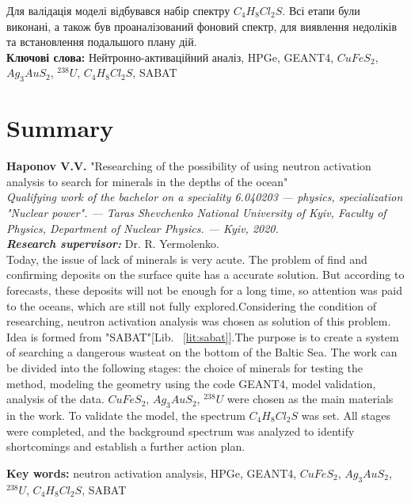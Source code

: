 \documentclass[a4paper, 14pt]{article}
\numberwithin{equation}{section}
\numberwithin{table}{section}
\begin{document}
Для валідація моделі відбувався набір спектру $C_4H_8Cl_2S$.
Всі етапи були виконані, а також був проаналізований фоновий спектр, для виявлення недоліків та встановлення подальшого плану дій. \\
{\bf Ключові слова:} Нейтронно-активаційний аналіз, HPGe, GEANT4, $CuFeS_2$, $Ag_3AuS_2$, $^{238}U$, $C_4H_8Cl_2S$, SABAT

\newpage
\thispagestyle{empty}
\section*{Summary}

{\bf Haponov V.V.} "Researching of the possibility of using neutron activation analysis to search for minerals in the depths of the ocean"\\
{\itshape Qualifying work of the bachelor on a speciality 6.040203 --- physics, specialization "Nuclear power". --- Taras Shevchenko National University of Kyiv, Faculty of Physics, Department of Nuclear Physics. --- Kyiv, 2020.\\}
{\itshape \bfseries Research supervisor:} Dr. R. Yermolenko.
\\[0.5cm]
Today, the issue of lack of minerals is very acute. The problem of find and confirming deposits on the surface quite has a accurate solution.
But according to forecasts, these deposits will not be enough for a long time, so
attention was paid to the oceans, which are still not fully explored.Considering the condition of researching, neutron activation analysis was chosen as
solution of this problem. Idea is formed from "SABAT"[Lib. ~\ref{lit:sabat}].The purpose is to create a  system  of searching a dangerous wasteat on
the bottom of the Baltic Sea. The work can be divided into the
following stages: the choice of minerals for testing the method, modeling the
geometry using the code GEANT4, model validation, analysis of the data.
$ CuFeS_2 $, $ Ag_3AuS_2 $, $ ^ {238} U $ were chosen as the main materials in the work.
To validate the model, the spectrum $ C_4H_8Cl_2S $ was set. All stages were
completed, and the background spectrum was analyzed to identify shortcomings and establish a further action plan.

{\bf Key words:} neutron activation analysis, HPGe, GEANT4, $CuFeS_2$, $Ag_3AuS_2$, $^{238}U$, $C_4H_8Cl_2S$, SABAT

\newpage
\tableofcontents
\newpage
\pagestyle{plain}
\setcounter{page}{2}
\newpage
\end{document}
